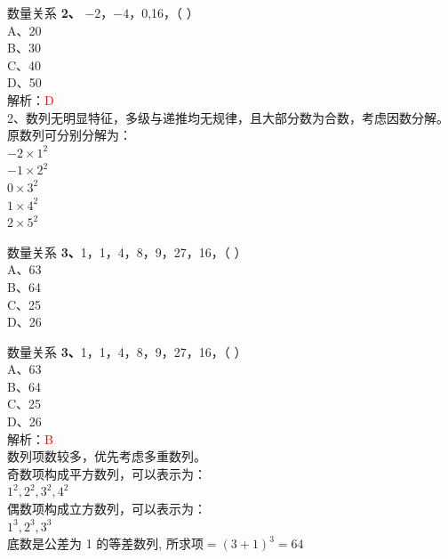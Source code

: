 \documentclass[aspectratio=169]{beamer}
\begin{document}
\begin{frame}[t]{数量关系}
    \textbf{2、} $-2$，$-4$，0,16，（ ）\\
    A、20\\
    B、30\\
    C、40\\
    D、50\\
    解析：\textcolor{red}{D}\\
    2、数列无明显特征，多级与递推均无规律，且大部分数为合数，考虑因数分解。原数列可分别分解为：\\
    $-2 \times 1^2$\\
    $-1 \times 2^2$\\
    $0 \times 3^2$\\
    $1 \times 4^2$\\
    $2 \times 5^2$\\
\end{frame}



\begin{frame}[t]{数量关系}
    \textbf{3、}1，1，4，8，9，27，16，（ ）\\
    A、63\\
    B、64\\
    C、25\\
    D、26\\
\end{frame}


\begin{frame}[t]{数量关系}
    \textbf{3、}1，1，4，8，9，27，16，（ ）\\
    A、63\\
    B、64\\
    C、25\\
    D、26\\
    解析：\textcolor{red}{B}\\
    数列项数较多，优先考虑多重数列。\\
    奇数项构成平方数列，可以表示为：\\
    $1^2, 2^2, 3^2, 4^2$\\
    偶数项构成立方数列，可以表示为：\\
    $1^3, 2^3, 3^3$\\
    底数是公差为 1 的等差数列, 所求项$=(3+1)^3 = 64$\\
\end{frame}
\end{document}
